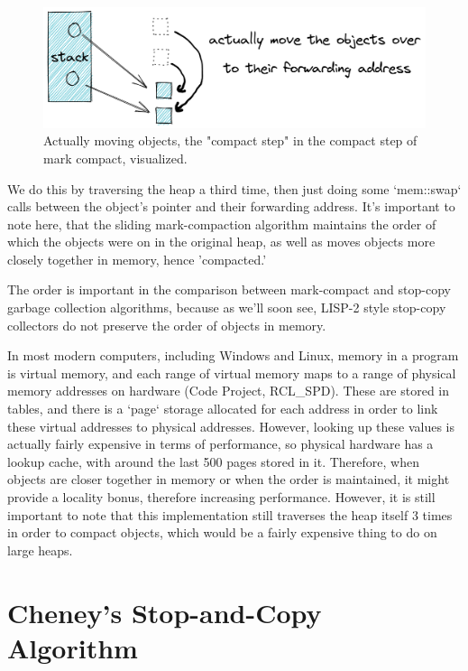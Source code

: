\documentclass[index]{subfiles}
\begin{document}
\begin{figure}[H]
    \centering
    \includegraphics[scale=0.3]{pics/actually-move.png}
    \caption{Actually moving objects, the "compact step" in the compact step of mark compact, visualized.}
\end{figure}

We do this by traversing the heap a third time, then just doing some `mem::swap` calls between the object's pointer and their forwarding address. It's important to note here, that the sliding mark-compaction algorithm maintains the order of which the objects were on in the original heap, as well as moves objects more closely together in memory, hence 'compacted.'

The order is important in the comparison between mark-compact and stop-copy garbage collection algorithms, because as we'll soon see, LISP-2 style stop-copy collectors do not preserve the order of objects in memory.

In most modern computers, including Windows and Linux, memory in a program is virtual memory, and each range of virtual memory maps to a range of physical memory addresses on hardware (Code Project, RCL\_SPD). These are stored in tables, and there is a  `page` storage allocated for each address in order to link these virtual addresses to physical addresses. However, looking up these values is actually fairly expensive in terms of performance, so physical hardware has a lookup cache, with around the last 500 pages stored in it. Therefore, when objects are closer together in memory or when the order is maintained, it might provide a locality bonus, therefore increasing performance. However, it is still important to note that this implementation still traverses the heap itself 3 times in order to compact objects, which would be a fairly expensive thing to do on large heaps.

\section{Cheney's Stop-and-Copy Algorithm}
\end{document}
